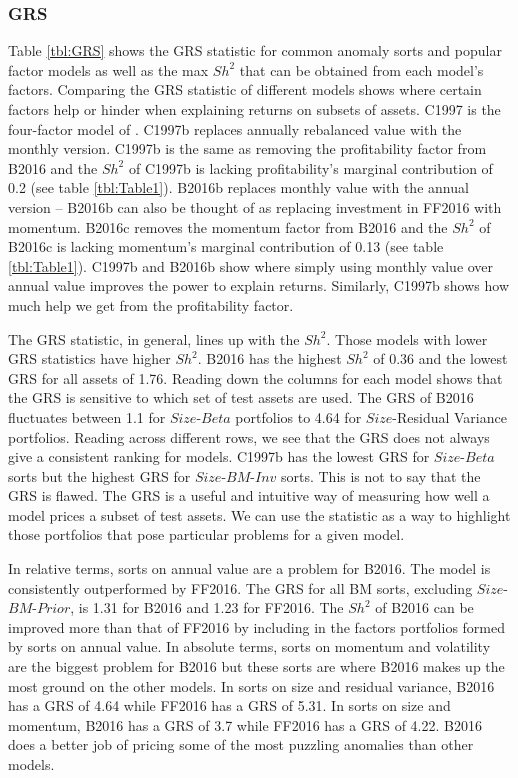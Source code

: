 
\subsubsection{GRS}


Table \ref{tbl:GRS} shows the GRS statistic for common anomaly sorts and popular factor
models as well as the max $Sh^2$ that can be obtained from each model's factors. Comparing
the GRS statistic of different models shows where certain factors help or hinder when
explaining returns on subsets of assets. C1997 is the four-factor model of
\textcite{carhart1997persistence}. C1997b replaces annually rebalanced value with the
monthly version. C1997b is the same as removing the profitability factor from B2016 and
the $Sh^2$ of C1997b is lacking profitability's marginal contribution of 0.2 (see table
\ref{tbl:Table1}). B2016b replaces monthly value with the annual version -- B2016b can
also be thought of as replacing investment in FF2016 with momentum. B2016c removes the
momentum factor from B2016 and the $Sh^2$ of B2016c is lacking momentum's marginal
contribution of 0.13 (see table \ref{tbl:Table1}). C1997b and B2016b show where simply
using monthly value over annual value improves the power to explain returns. Similarly,
C1997b shows how much help we get from the profitability factor.

The GRS statistic, in general, lines up with the $Sh^2$. Those models with lower GRS
statistics have higher $Sh^2$. B2016 has the highest $Sh^2$ of 0.36 and the lowest GRS for
all assets of 1.76. Reading down the columns for each model shows that the GRS is
sensitive to which set of test assets are used. The GRS of B2016 fluctuates between 1.1
for $Size$-$Beta$ portfolios to 4.64 for $Size$-Residual Variance portfolios. Reading
across different rows, we see that the GRS does not always give a consistent ranking for
models. C1997b has the lowest GRS for $Size$-$Beta$ sorts but the highest GRS for
$Size$-$BM$-$Inv$ sorts. This is not to say that the GRS is flawed. The GRS is a useful
and intuitive way of measuring how well a model prices a subset of test assets. We can use
the statistic as a way to highlight those portfolios that pose particular problems for a
given model.

In relative terms, sorts on annual value are a problem for B2016. The model is
consistently outperformed by FF2016. The GRS for all BM sorts, excluding
$Size$-$BM$-$Prior$, is 1.31 for B2016 and 1.23 for FF2016. The $Sh^2$ of B2016 can be
improved more than that of FF2016 by including in the factors portfolios formed by sorts
on annual value. In absolute terms, sorts on momentum and volatility are the biggest
problem for B2016 but these sorts are where B2016 makes up the most ground on the other
models. In sorts on size and residual variance, B2016 has a GRS of 4.64 while FF2016 has a
GRS of 5.31. In sorts on size and momentum, B2016 has a GRS of 3.7 while FF2016 has a GRS
of 4.22. B2016 does a better job of pricing some of the most puzzling anomalies
\parencite{fama2016dissecting} than other models.

